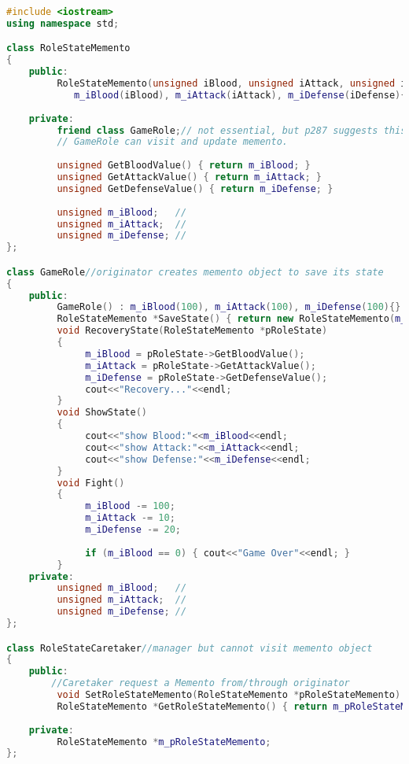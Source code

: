 \documentclass{book}
\begin{document}
\begin{lstlisting}[caption={Memento Pattern example 3}, language=C++]
#include <iostream>
using namespace std;

class RoleStateMemento
{
    public:
         RoleStateMemento(unsigned iBlood, unsigned iAttack, unsigned iDefense) :
            m_iBlood(iBlood), m_iAttack(iAttack), m_iDefense(iDefense){}
    
    private:
         friend class GameRole;// not essential, but p287 suggests this, to do so, only
         // GameRole can visit and update memento.
    
         unsigned GetBloodValue() { return m_iBlood; }
         unsigned GetAttackValue() { return m_iAttack; }
         unsigned GetDefenseValue() { return m_iDefense; }
    
         unsigned m_iBlood;   // 
         unsigned m_iAttack;  // 
         unsigned m_iDefense; // 
};

class GameRole//originator creates memento object to save its state
{
    public:
         GameRole() : m_iBlood(100), m_iAttack(100), m_iDefense(100){}
         RoleStateMemento *SaveState() { return new RoleStateMemento(m_iBlood, m_iAttack, m_iDefense); }
         void RecoveryState(RoleStateMemento *pRoleState)
         {
              m_iBlood = pRoleState->GetBloodValue();
              m_iAttack = pRoleState->GetAttackValue();
              m_iDefense = pRoleState->GetDefenseValue();
              cout<<"Recovery..."<<endl;
         }
         void ShowState()
         {
              cout<<"show Blood:"<<m_iBlood<<endl;
              cout<<"show Attack:"<<m_iAttack<<endl;
              cout<<"show Defense:"<<m_iDefense<<endl;
         }
         void Fight()
         {
              m_iBlood -= 100;
              m_iAttack -= 10;
              m_iDefense -= 20;
    
              if (m_iBlood == 0) { cout<<"Game Over"<<endl; }
         }
    private:
         unsigned m_iBlood;   //
         unsigned m_iAttack;  // 
         unsigned m_iDefense; //
};

class RoleStateCaretaker//manager but cannot visit memento object
{
    public:
        //Caretaker request a Memento from/through originator
         void SetRoleStateMemento(RoleStateMemento *pRoleStateMemento) { m_pRoleStateMemento = pRoleStateMemento; }
         RoleStateMemento *GetRoleStateMemento() { return m_pRoleStateMemento; }
    
    private:
         RoleStateMemento *m_pRoleStateMemento;
};


\end{lstlisting}
\end{document}
